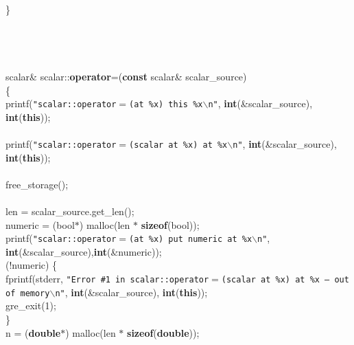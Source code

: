 \begin{flushleft}
\}\mbox{}\\
\mbox{}\\
\mbox{}\\
\mbox{}\\
\mbox{}\\
scalar\& scalar::{\bf operator}=({\bf const} scalar\& scalar\_source)\mbox{}\\
\{\mbox{}\\
\hspace*{4\indentation}printf({\tt"scalar::operator$=$(at \%x) this \%x$\backslash$n"}, {\bf int}(\&scalar\_source), {\bf int}({\bf this}));\mbox{}\\
\mbox{}\\
\hspace*{4\indentation}printf({\tt"scalar::operator$=$(scalar at \%x) at \%x$\backslash$n"}, {\bf int}(\&scalar\_source), {\bf int}({\bf this}));\mbox{}\\
\mbox{}\\
\hspace*{4\indentation}free\_storage();\mbox{}\\
\mbox{}\\
\hspace*{4\indentation}len = scalar\_source.get\_len();\mbox{}\\
\hspace*{4\indentation}numeric = (bool$\ast$) malloc(len $\ast$ {\bf sizeof}(bool));\mbox{}\\
\hspace*{4\indentation}printf({\tt"scalar::operator$=$(at \%x) put numeric at \%x$\backslash$n"}, {\bf int}(\&scalar\_source),{\bf int}(\&numeric));\mbox{}\\
\hspace*{4\indentation}{\bf if} (!numeric) \{\mbox{}\\
\hspace*{8\indentation}fprintf(stderr, {\tt"Error \#1 in scalar::operator$=$(scalar at \%x) at \%x -- out of memory$\backslash$n"}, {\bf int}(\&scalar\_source), {\bf int}({\bf this}));\mbox{}\\
\hspace*{8\indentation}gre\_exit(1);\mbox{}\\
\hspace*{4\indentation}\}\mbox{}\\
\hspace*{4\indentation}n = ({\bf double}$\ast$) malloc(len $\ast$ {\bf sizeof}({\bf double}));\mbox{}\\

\end{flushleft}
